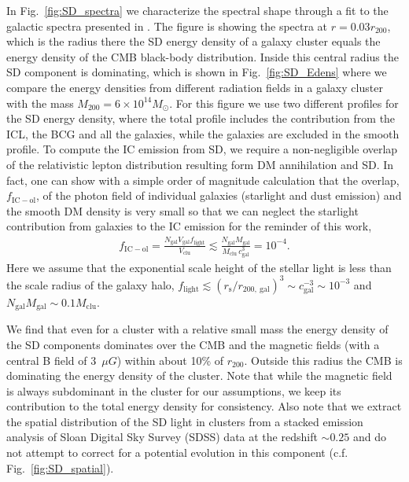 \documentclass[10pt,aps,pra,reprint,amsmath,amsfonts,amssymb,showpacs,nofootinbib,floatfix]{revtex4-1}
\newcommand{\rmn}{\mathrm}
\newcommand{\msun}{M_\odot}
\newcommand{\rvir}{r_{200}}
\newcommand{\mvir}{M_{200}}
\begin{document}
In Fig.~\ref{fig:SD_spectra} we characterize the spectral shape
through a fit to the galactic spectra presented in
\cite{2006ApJ...648L..29P}.  The figure is showing the spectra at
$r=0.03\rvir$, which is the radius there the SD energy density of a
galaxy cluster equals the energy density of the CMB black-body
distribution. Inside this central radius the SD component is
dominating, which is shown in Fig.~\ref{fig:SD_Edens} where we compare
the energy densities from different radiation fields in a galaxy
cluster with the mass $\mvir=6\times10^{14}\msun$. For this figure we
use two different profiles for the SD energy density, where the total
profile includes the contribution from the ICL, the BCG and all the
galaxies, while the galaxies are excluded in the smooth profile. To
compute the IC emission from SD, we require a non-negligible overlap
of the relativistic lepton distribution resulting form DM annihilation
and SD.  In fact, one can show with a simple order of magnitude
calculation that the overlap, $f_\rmn{IC-ol}$, of the photon field of
individual galaxies (starlight and dust emission) and the smooth DM
density is very small so that we can neglect the starlight
contribution from galaxies to the IC emission for the reminder of this
work,
\begin{eqnarray}
f_\rmn{IC-ol} = \frac{N_\rmn{gal} V_\rmn{gal} f_\rmn{light}}{V_\rmn{clu}}
\lesssim  \frac{N_\rmn{gal} M_\rmn{gal}}{M_\rmn{clu}\,c_\rmn{gal}^{3}}=10^{-4}.
\end{eqnarray}
Here we assume that the exponential scale height of the stellar light
is less than the scale radius of the galaxy halo, $f_\rmn{light}
\lesssim (r_\rmn{s} / r_{200,~\rmn{gal}})^3 \sim c_\rmn{gal}^{-3} \sim
10^{-3}$ and $N_\rmn{gal} M_\rmn{gal} \sim 0.1 M_\rmn{clu}$.

We find that even for a cluster with a relative small mass the energy
density of the SD components dominates over the CMB and the magnetic
fields (with a central B field of 3~$\mu G$) within about 10\% of
$\rvir$. Outside this radius the CMB is dominating the energy density
of the cluster.  Note that while the magnetic field is always
subdominant in the cluster for our assumptions, we keep its
contribution to the total energy density for consistency. Also note
that we extract the spatial distribution of the SD light in clusters
from a stacked emission analysis of Sloan Digital Sky Survey (SDSS)
data at the redshift $\sim 0.25$ \cite{2005MNRAS.358..949Z} and do not
attempt to correct for a potential evolution in this component
(c.f. Fig.~\ref{fig:SD_spatial}).
\end{document}
